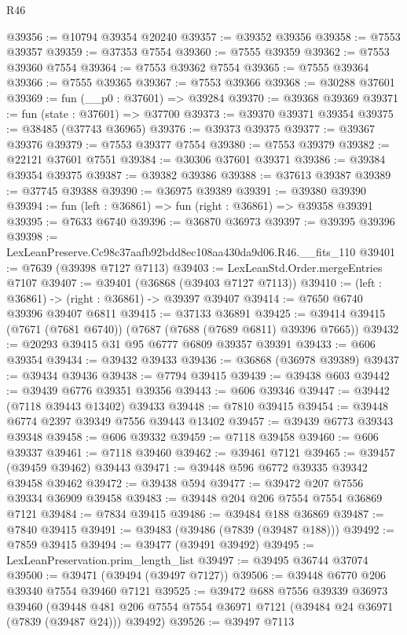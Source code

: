 \begin{lexlean}{R46}
\begin{coremodule}
@39356 := @10794 @39354 @20240
@39357 := @39352 @39356
@39358 := @7553 @39357
@39359 := @37353 @7554
@39360 := @7555 @39359
@39362 := @7553 @39360 @7554
@39364 := @7553 @39362 @7554
@39365 := @7555 @39364
@39366 := @7555 @39365
@39367 := @7553 @39366
@39368 := @30288 @37601
@39369 := fun (__p0 : @37601) => @39284
@39370 := @39368 @39369
@39371 := fun (state : @37601) => @37700
@39373 := @39370 @39371 @39354
@39375 := @38485 (@37743 @36965)
@39376 := @39373 @39375
@39377 := @39367 @39376
@39379 := @7553 @39377 @7554
@39380 := @7553 @39379
@39382 := @22121 @37601 @7551
@39384 := @30306 @37601 @39371
@39386 := @39384 @39354 @39375
@39387 := @39382 @39386
@39388 := @37613 @39387
@39389 := @37745 @39388
@39390 := @36975 @39389
@39391 := @39380 @39390
@39394 := fun (left : @36861) => fun (right : @36861) => @39358 @39391
@39395 := @7633 @6740
@39396 := @36870 @36973
@39397 := @39395 @39396
@39398 := LexLeanPreserve.Cc98c37aafb92bdd8ec108aa430da9d06.R46.__fits_110
@39401 := @7639 (@39398 @7127 @7113)
@39403 := LexLeanStd.Order.mergeEntries @7107
@39407 := @39401 (@36868 (@39403 @7127 @7113))
@39410 := (left : @36861) -> (right : @36861) -> @39397 @39407
@39414 := @7650 @6740 @39396 @39407 @6811
@39415 := @37133 @36891
@39425 := @39414 @39415 (@7671 (@7681 @6740)) (@7687 (@7688 (@7689 @6811) @39396 @7665))
@39432 := @20293 @39415 @31 @95 @6777 @6809 @39357 @39391
@39433 := @606 @39354
@39434 := @39432 @39433
@39436 := @36868 (@36978 @39389)
@39437 := @39434 @39436
@39438 := @7794 @39415
@39439 := @39438 @603
@39442 := @39439 @6776 @39351 @39356
@39443 := @606 @39346
@39447 := @39442 (@7118 @39443 @13402) @39433
@39448 := @7810 @39415
@39454 := @39448 @6774 @2397 @39349 @7556 @39443 @13402
@39457 := @39439 @6773 @39343 @39348
@39458 := @606 @39332
@39459 := @7118 @39458
@39460 := @606 @39337
@39461 := @7118 @39460
@39462 := @39461 @7121
@39465 := @39457 (@39459 @39462) @39443
@39471 := @39448 @596 @6772 @39335 @39342 @39458 @39462
@39472 := @39438 @594
@39477 := @39472 @207 @7556 @39334 @36909 @39458
@39483 := @39448 @204 @206 @7554 @7554 @36869 @7121
@39484 := @7834 @39415
@39486 := @39484 @188 @36869
@39487 := @7840 @39415
@39491 := @39483 (@39486 (@7839 (@39487 @188)))
@39492 := @7859 @39415
@39494 := @39477 (@39491 @39492)
@39495 := LexLeanPreservation.prim_length_list
@39497 := @39495 @36744 @37074
@39500 := @39471 (@39494 (@39497 @7127))
@39506 := @39448 @6770 @206 @39340 @7554 @39460 @7121
@39525 := @39472
    @688
    @7556
    @39339
    @36973
    @39460
    (@39448 @481 @206 @7554 @7554 @36971 @7121 (@39484 @24 @36971 (@7839 (@39487 @24))) @39492)
@39526 := @39497 @7113

\end{coremodule}
\end{lexlean}
